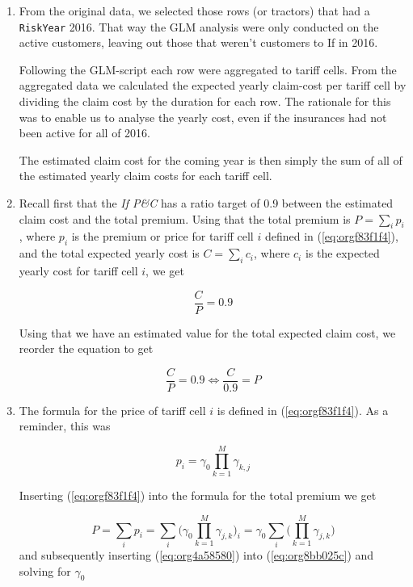 \documentclass[11pt]{article}
\begin{document}
\begin{enumerate}
\item From the original data, we selected those rows (or tractors) that had a \texttt{RiskYear} 2016. That 
way the GLM analysis were only conducted on the active customers, leaving out those that weren't 
customers to If in 2016. 

Following the GLM-script each row were aggregated to tariff cells.
From the aggregated data we calculated the expected yearly claim-cost per tariff cell by dividing the
claim cost by the duration for each row. The rationale for this was to enable us to analyse the 
yearly cost, even if the insurances had not been active for all of 2016. 

The estimated claim cost for the coming year is then simply the sum of all of the estimated yearly 
claim costs for each tariff cell.

\item Recall first that the \emph{If P\&C} has a ratio target of 0.9 between the estimated claim cost and the total premium.
Using that the total premium is \(P = \sum_i p_i\), where \(p_i\) is the premium or price for tariff cell \(i\) defined 
in (\ref{eq:orgf83f1f4}), and the total expected yearly cost is \(C = \sum_i c_i\), where \(c_i\) is the expected yearly cost 
for tariff cell \(i\), we get

\begin{equation}
\label{eq:org5676fb9}
  \frac{C}{P} = 0.9 
\end{equation}

Using that we have an estimated value for the total expected claim cost, we reorder the equation to get

\begin{equation}
\label{eq:org8bb025c}
\frac{C}{P} = 0.9 \iff \frac{C}{0.9} = P
\end{equation}

\item The formula for the price of tariff cell \(i\) is defined in (\ref{eq:orgf83f1f4}). As a reminder, this was

\[
      p_i = \gamma_0 \prod_{k = 1}^M \gamma_{k,j}
      \]

Inserting (\ref{eq:orgf83f1f4}) into the formula for the total premium we get

\begin{equation}
\label{eq:org4a58580}
P = \sum_i p_i = \sum_i \bigg (\gamma_0 \prod_{k = 1}^M \gamma_{j,k} \bigg)_i =  \gamma_0 \sum_i \bigg ( \prod_{k = 1}^M \gamma_{j,k} \bigg)
\end{equation}
and subsequently inserting (\ref{eq:org4a58580}) into (\ref{eq:org8bb025c}) and solving for \(\gamma_0\) 


\end{enumerate}
\end{document}
